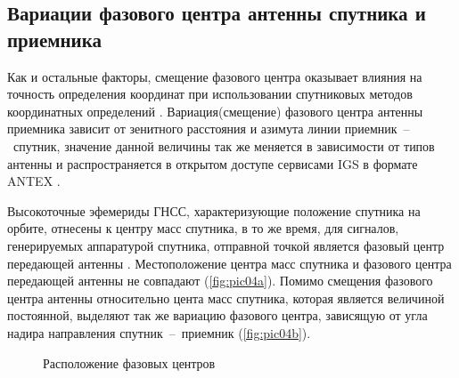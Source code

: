 \subsection{Вариации фазового центра антенны спутника и приемника}\label{subsec:ch1/sec3/sub3}

Как и остальные факторы, смещение фазового центра оказывает влияния на точность определения координат при использовании спутниковых методов координатных определений \cite{src36}. Вариация(смещение) фазового центра антенны приемника зависит от зенитного расстояния и азимута линии приемник~--~спутник, значение данной величины так же меняется в зависимости от типов антенны и распространяется в открытом доступе сервисами IGS в формате ANTEX \cite{src13,mak03,src82}.

Высокоточные эфемериды ГНСС, характеризующие положение спутника на орбите, отнесены к центру масс спутника, в то же время, для сигналов, генерируемых аппаратурой спутника, отправной точкой является фазовый центр передающей антенны \cite{src86,src90}. Местоположение центра масс спутника и фазового центра передающей антенны не совпадают (\cref{fig:pic04a}). Помимо смещения фазового центра антенны относительно цента масс спутника, которая является величиной постоянной, выделяют так же вариацию фазового центра, зависящую от угла надира направления спутник~--~приемник (\cref{fig:pic04b}).

\begin{figure}[ht]
	\caption[Расположение фазовых центров]{Расположение фазовых центров}\label{fig:pic04}
\end{figure}

